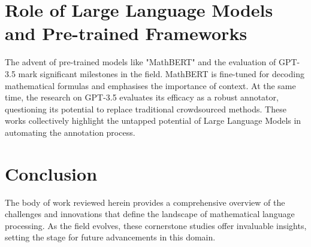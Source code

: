 \section{Role of Large Language Models and Pre-trained Frameworks}

The advent of pre-trained models like "MathBERT" \citep{peng2021mathbert} and the evaluation of GPT-3.5 \citep{he2023annollm} mark significant milestones in the field. MathBERT is fine-tuned for decoding mathematical formulas and emphasises the importance of context. At the same time, the research on GPT-3.5 evaluates its efficacy as a robust annotator, questioning its potential to replace traditional crowdsourced methods. These works collectively highlight the untapped potential of Large Language Models in automating the annotation process.

\section{Conclusion}

The body of work reviewed herein provides a comprehensive overview of the challenges and innovations that define the landscape of mathematical language processing. As the field evolves, these cornerstone studies offer invaluable insights, setting the stage for future advancements in this domain.

